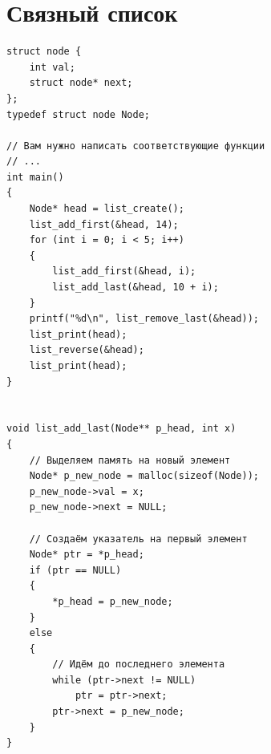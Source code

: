 \documentclass{article}
\begin{document}
\section*{Связный список}
\begin{multicols}{2}
\begin{lstlisting}
struct node {
    int val;
    struct node* next;
};
typedef struct node Node;

// Вам нужно написать соответствующие функции
// ...
int main()
{
    Node* head = list_create();
    list_add_first(&head, 14);
    for (int i = 0; i < 5; i++)
    {
        list_add_first(&head, i);
        list_add_last(&head, 10 + i); 
    }
    printf("%d\n", list_remove_last(&head));
    list_print(head);
    list_reverse(&head);
    list_print(head);
}


void list_add_last(Node** p_head, int x)
{
    // Выделяем память на новый элемент
    Node* p_new_node = malloc(sizeof(Node));
    p_new_node->val = x;
    p_new_node->next = NULL;
    
    // Создаём указатель на первый элемент
    Node* ptr = *p_head;
    if (ptr == NULL)
    {
        *p_head = p_new_node;
    }
    else
    {
        // Идём до последнего элемента
        while (ptr->next != NULL)
            ptr = ptr->next;
        ptr->next = p_new_node;
    }
}   
\end{lstlisting}
\begin{center}
\end{center}
\end{multicols}
\end{document}

